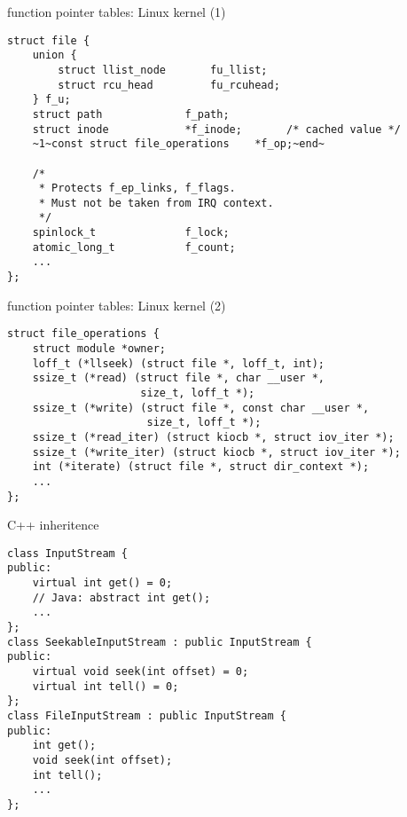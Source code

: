 
\begin{frame}[fragile,label=kernelFTbl]{function pointer tables: Linux kernel (1)}
\begin{lstlisting}
struct file {
    union {
        struct llist_node       fu_llist;
        struct rcu_head         fu_rcuhead;
    } f_u;
    struct path             f_path;
    struct inode            *f_inode;       /* cached value */
    ~1~const struct file_operations    *f_op;~end~

    /*
     * Protects f_ep_links, f_flags.
     * Must not be taken from IRQ context.
     */
    spinlock_t              f_lock;
    atomic_long_t           f_count;
    ...
};
\end{lstlisting}
\end{frame}

\begin{frame}[fragile,label=kernelFTbl2]{function pointer tables: Linux kernel (2)}
\begin{lstlisting}
struct file_operations {
    struct module *owner;
    loff_t (*llseek) (struct file *, loff_t, int);
    ssize_t (*read) (struct file *, char __user *,
                     size_t, loff_t *);
    ssize_t (*write) (struct file *, const char __user *,
                      size_t, loff_t *);
    ssize_t (*read_iter) (struct kiocb *, struct iov_iter *);
    ssize_t (*write_iter) (struct kiocb *, struct iov_iter *);
    int (*iterate) (struct file *, struct dir_context *);
    ...
};
\end{lstlisting}
\end{frame}



\begin{frame}[fragile,label=CPPVirt]{C++ inheritence}
\lstset{
    language=C++,style=smaller,
}
    \vspace{-.5cm}
\begin{lstlisting}
class InputStream {
public:
    virtual int get() = 0;
    // Java: abstract int get();
    ...
};
class SeekableInputStream : public InputStream {
public:
    virtual void seek(int offset) = 0;
    virtual int tell() = 0;
};
class FileInputStream : public InputStream {
public:
    int get();
    void seek(int offset);
    int tell();
    ...
};
\end{lstlisting}
\end{frame}

